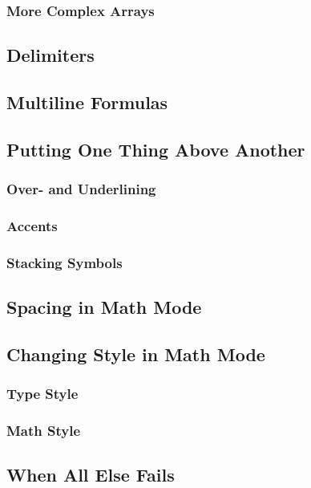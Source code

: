 \subsubsection{More Complex Arrays}


\subsection{Delimiters}


\subsection{Multiline Formulas}


\subsection{Putting One Thing Above Another}
\subsubsection{Over- and Underlining}
\subsubsection{Accents}
\subsubsection{Stacking Symbols}


\subsection{Spacing in Math Mode}


\subsection{Changing Style in Math Mode}
\subsubsection{Type Style}
\subsubsection{Math Style}


\subsection{When All Else Fails}
\newpage